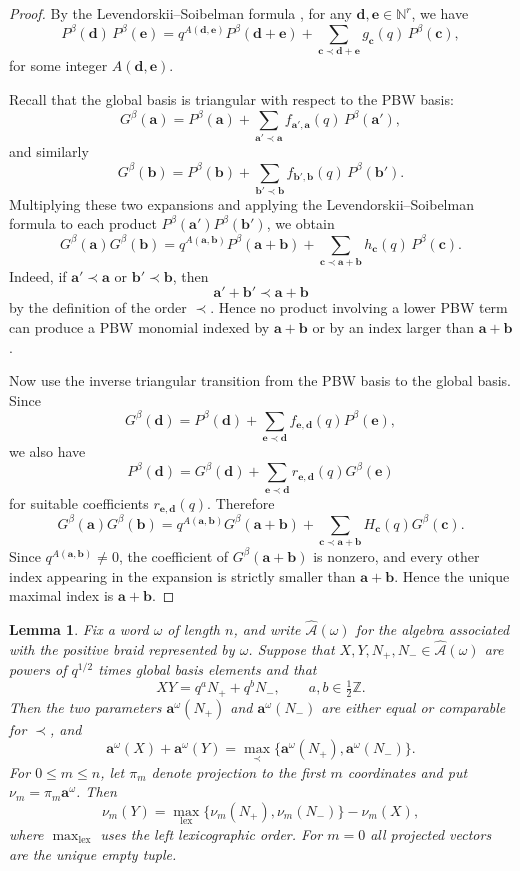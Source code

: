 \documentclass[12pt, reqno]{amsart}
\theoremstyle{plain}
\newtheorem{lemma}[theorem]{Lemma}
\theoremstyle{definition}
\numberwithin{equation}{section}
\newcommand{\bb}{\mathbf{b}}
\newcommand{\bfa}{\mathbf{a}}
\begin{document}
\begin{proof}
By the Levendorskii--Soibelman formula
\cite[Lemma~5.5]{oh2025pbw}, for any
\(\mathbf d,\mathbf e\in\mathbb N^r\), we have
\[
P^\beta(\mathbf d)\,P^\beta(\mathbf e)
=
q^{A(\mathbf d,\mathbf e)}P^\beta(\mathbf d+\mathbf e)
+
\sum_{\mathbf c\prec \mathbf d+\mathbf e}
g_{\mathbf c}(q)\,P^\beta(\mathbf c),
\]
for some integer \(A(\mathbf d,\mathbf e)\).

Recall that the global basis is triangular with respect to the PBW basis:
\[
G^\beta(\bfa)
=
P^\beta(\bfa)
+
\sum_{\bfa'\prec\bfa}
f_{\bfa',\bfa}(q)\,P^\beta(\bfa'),
\]
and similarly
\[
G^\beta(\bb)
=
P^\beta(\bb)
+
\sum_{\bb'\prec\bb}
f_{\bb',\bb}(q)\,P^\beta(\bb').
\]
Multiplying these two expansions and applying the Levendorskii--Soibelman
formula to each product \(P^\beta(\bfa')P^\beta(\bb')\), we obtain
\[
G^\beta(\bfa)G^\beta(\bb)
=
q^{A(\bfa,\bb)}P^\beta(\bfa+\bb)
+
\sum_{\mathbf c\prec\bfa+\bb}
h_{\mathbf c}(q)\,P^\beta(\mathbf c).
\]
Indeed, if \(\bfa'\prec\bfa\) or \(\bb'\prec\bb\), then
\[
\bfa'+\bb'\prec\bfa+\bb
\]
by the definition of the order $\prec$. Hence no product involving a lower
PBW term can produce a PBW monomial indexed by \(\bfa+\bb\) or by an index
larger than \(\bfa+\bb\).

Now use the inverse triangular transition from the PBW basis to the global
basis. Since
\[
G^\beta(\mathbf d)
=
P^\beta(\mathbf d)
+
\sum_{\mathbf e\prec\mathbf d}
f_{\mathbf e,\mathbf d}(q)P^\beta(\mathbf e),
\]
we also have
\[
P^\beta(\mathbf d)
=
G^\beta(\mathbf d)
+
\sum_{\mathbf e\prec\mathbf d}
r_{\mathbf e,\mathbf d}(q)G^\beta(\mathbf e)
\]
for suitable coefficients \(r_{\mathbf e,\mathbf d}(q)\). Therefore
\[
G^\beta(\bfa)G^\beta(\bb)
=
q^{A(\bfa,\bb)}G^\beta(\bfa+\bb)
+
\sum_{\mathbf c\prec\bfa+\bb}
H_{\mathbf c}(q)G^\beta(\mathbf c).
\]
Since \(q^{A(\bfa,\bb)}\neq 0\), the coefficient of
\(G^\beta(\bfa+\bb)\) is nonzero, and every other index appearing in the
expansion is strictly smaller than \(\bfa+\bb\). Hence the unique maximal
index is \(\bfa+\bb\).
\end{proof}

\begin{lemma}\label{lem:exchange-parameters}
Fix a word $\omega$ of length $n$, and write $\widehat{\mathcal A}(\omega)$
for the algebra associated with the positive braid represented by $\omega$.
Suppose that $X,Y,N_+,N_-\in\widehat{\mathcal A}(\omega)$ are powers of
$q^{1/2}$ times global basis elements and that
\[
    XY=q^aN_++q^bN_-,\qquad a,b\in\tfrac12\mathbb Z.
\]
Then the two parameters $\mathbf a^\omega(N_+)$ and
$\mathbf a^\omega(N_-)$ are either equal or comparable for $\prec$, and
\[
    \mathbf a^\omega(X)+\mathbf a^\omega(Y)
    =\max_{\prec}\{\mathbf a^\omega(N_+),\mathbf a^\omega(N_-)\}.
\]
For $0\leq m\leq n$, let $\pi_m$ denote projection to the first $m$
coordinates and put $\nu_m=\pi_m\mathbf a^\omega$. Then
\begin{equation}\label{eq:prefix-exchange-parameters}
    \nu_m(Y)
    =\max_{\mathrm{lex}}\{\nu_m(N_+),\nu_m(N_-)\}-\nu_m(X),
\end{equation}
where $\max_{\mathrm{lex}}$ uses the left lexicographic order. For $m=0$
all projected vectors are the unique empty tuple.
\end{lemma}
\end{document}

